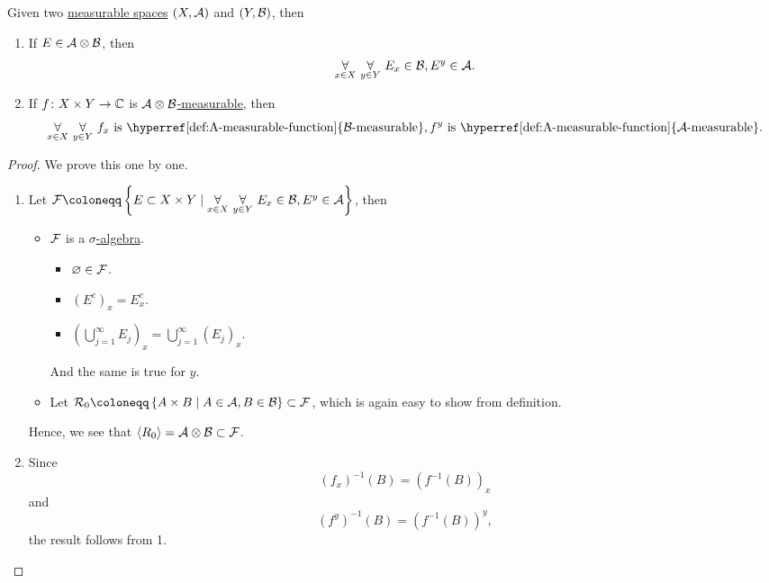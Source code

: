 \begin{proposition}
	Given two \hyperref[def:measurable-space]{measurable spaces} \((X, \mathcal{\MakeUppercase{a}} )\) and \((Y, \mathcal{\MakeUppercase{b}} )\), then
	\begin{enumerate}[(1)]
		\item If \(E\in \mathcal{\MakeUppercase{a}} \otimes \mathcal{\MakeUppercase{b}}\), then
		      \[
			      \underset{x\in X}{\forall }\ \underset{y\in Y}{\forall }\ E_x\in \mathcal{\MakeUppercase{b}} , E^y\in \mathcal{\MakeUppercase{a}}.
		      \]
		\item If \(f\colon X\times Y\to \mathbb{\MakeUppercase{c}} \) is \hyperref[def:A-measurable-function]{\(\mathcal{\MakeUppercase{a}} \otimes \mathcal{\MakeUppercase{b}} \)-measurable}, then
		      \[
			      \underset{x\in X}{\forall }\ \underset{y\in Y}{\forall }\ f_x \text{ is \hyperref[def:A-measurable-function]{\(\mathcal{\MakeUppercase{b}}\)-measurable}}, f^y \text{ is \hyperref[def:A-measurable-function]{\(\mathcal{\MakeUppercase{a}}\)-measurable}}.
		      \]
	\end{enumerate}
\end{proposition}
\begin{proof}
	We prove this one by one.
	\begin{enumerate}[(1)]
		\item Let \(\mathcal{\MakeUppercase{f}} \coloneqq \left\{E\subset X\times Y \mid \underset{x\in X}{\forall }\ \underset{y\in Y}{\forall }\ E_x\in \mathcal{\MakeUppercase{b}} , E^y\in \mathcal{\MakeUppercase{a}}\right\}\), then
		      \begin{itemize}
			      \item \(\mathcal{\MakeUppercase{f}} \) is a \hyperref[def:sigma-algebra]{\(\sigma\)-algebra}.
			            \begin{itemize}
				            \item \(\varnothing \in \mathcal{\MakeUppercase{f}} \).
				            \item \((E^{c} )_x = E_{x}^{c}\).
				            \item \(\left(\bigcup\limits_{j=1}^{\infty} E_{j} \right)_x = \bigcup\limits_{j=1}^{\infty} (E_{j} )_{x} \).
			            \end{itemize}
			            And the same is true for \(y\).
			      \item Let \(\mathcal{\MakeUppercase{r}} _0 \coloneqq \left\{A\times B \mid A\in \mathcal{\MakeUppercase{a}} , B\in \mathcal{\MakeUppercase{b}} \right\}\subset \mathcal{\MakeUppercase{f}}\), which is again
			            easy to show from definition.
		      \end{itemize}
		      Hence, we see that \(\left< R_0 \right> = \mathcal{\MakeUppercase{a}} \otimes \mathcal{\MakeUppercase{b}} \subset \mathcal{\MakeUppercase{f}} \).
		\item Since
		      \[
			      (f_{x} )^{-1} (B) = (f^{-1} (B))_{x}
		      \]
		      and
		      \[
			      (f^{y} )^{-1} ({B} ) = (f^{-1} (B))^{y},
		      \]
		      the result follows from 1.
	\end{enumerate}
\end{proof}

